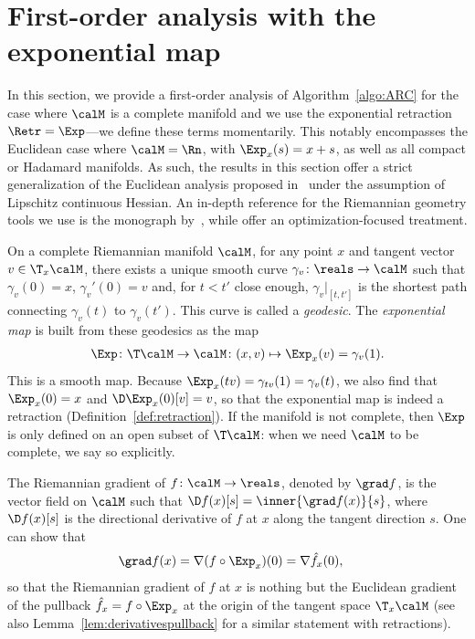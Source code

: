 \section{First-order analysis with the exponential map}
\label{sec:firstorderanalysisexp}


In this section, we provide a first-order analysis of Algorithm~\ref{algo:ARC} for the case where $\calM$ is a complete manifold and we use the exponential retraction $\Retr = \Exp$---we define these terms momentarily. This notably encompasses the Euclidean case where $\calM = \Rn$, with $\Exp_x(s) = x+s$, as well as all compact or Hadamard manifolds. As such, the results in this section offer a strict generalization of the Euclidean analysis proposed in~\citep{bcgmt} under the assumption of Lipschitz continuous Hessian. An in-depth reference for the Riemannian geometry tools we use is the monograph by~\citet{lee2018riemannian}, while \citet{AMS08} offer an optimization-focused treatment.

On a complete Riemannian manifold $\calM$, for any point $x$ and tangent vector $v \in \T_x\calM$, there exists a unique smooth curve $\gamma_v \colon \reals \to \calM$ such that $\gamma_v(0) = x$, $\gamma_v'(0) = v$ and, for $t < t'$ close enough, $\gamma_v|_{[t, t']}$ is the shortest path connecting $\gamma_v(t)$ to $\gamma_v(t')$. This curve is called a \emph{geodesic}. The \emph{exponential map} is built from these geodesics as the map
\begin{align*}
	\Exp \colon \T\calM \to \calM \colon (x, v) \mapsto \Exp_x(v) = \gamma_v(1).
\end{align*}
This is a smooth map. Because $\Exp_x(tv) = \gamma_{tv}(1) = \gamma_v(t)$, we also find that $\Exp_x(0) = x$ and $\D\Exp_x(0)[v] = v$, so that the exponential map is indeed a retraction (Definition~\ref{def:retraction}).
If the manifold is not complete, then $\Exp$ is only defined on an open subset of $\T\calM$: when we need $\calM$ to be complete, we say so explicitly.

The Riemannian gradient of $f \colon \calM \to \reals$, denoted by $\grad f$, is the vector field on $\calM$ such that $\D f(x)[s] = \inner{\grad f(x)}{s}$, where $\D f(x)[s]$ is the directional derivative of $f$ at $x$ along the tangent direction $s$. One can show that
\begin{align}
	\grad f(x) & = \nabla(f \circ \Exp_x)(0) = \nabla \hat f_x(0),
	\label{eq:gradfpullback}
\end{align}
so that the Riemannian gradient of $f$ at $x$ is nothing but the Euclidean gradient of the pullback $\hat f_x = f \circ \Exp_x$ at the origin of the tangent space $\T_x\calM$ (see also Lemma~\ref{lem:derivativespullback} for a similar statement with retractions).


